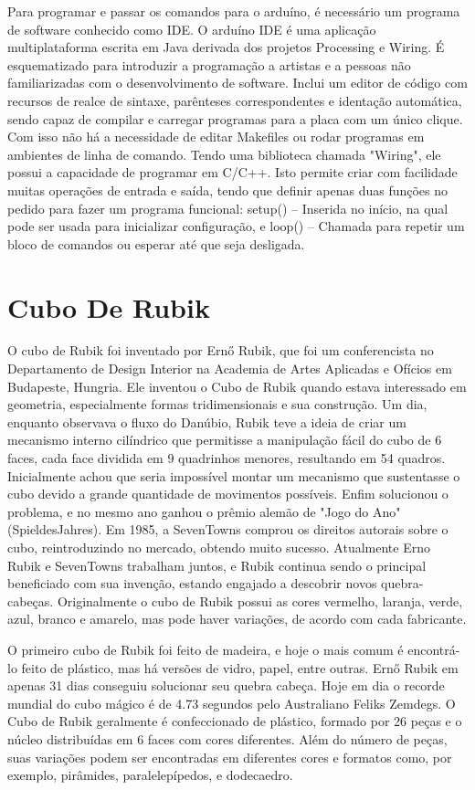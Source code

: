     Para programar e passar os comandos para o arduíno, é necessário um programa de software conhecido como IDE.  O arduíno IDE é uma aplicação multiplataforma escrita em Java derivada dos projetos Processing e Wiring. É esquematizado para introduzir a programação a artistas e a pessoas não familiarizadas com o desenvolvimento de software. Inclui um editor de código com recursos de realce de sintaxe, parênteses correspondentes e identação automática, sendo capaz de compilar e carregar programas para a placa com um único clique. Com isso não há a necessidade de editar Makefiles ou rodar programas em ambientes de linha de comando. Tendo uma biblioteca chamada "Wiring", ele possui a capacidade de programar em C/C++. Isto permite criar com facilidade muitas operações de entrada e saída, tendo que definir apenas duas funções no pedido para fazer um programa funcional: setup() – Inserida no início, na qual pode ser usada para inicializar configuração, e loop() – Chamada para repetir um bloco de comandos ou esperar até que seja desligada.\cite{arduinowiki}


\section{Cubo De Rubik}

O cubo de Rubik foi inventado por Ernő Rubik, que foi um conferencista no Departamento de Design Interior na Academia de Artes Aplicadas e Ofícios em Budapeste, Hungria. Ele inventou o  Cubo de Rubik quando estava interessado em geometria, especialmente formas tridimensionais e sua construção. Um dia, enquanto observava o fluxo do Danúbio, Rubik teve a ideia de criar um mecanismo interno cilíndrico que permitisse a manipulação fácil do cubo de 6 faces, cada face dividida em 9 quadrinhos menores, resultando em 54 quadros. Inicialmente achou que seria impossível montar um mecanismo que sustentasse o cubo devido a grande quantidade de movimentos possíveis. Enfim solucionou o problema, e no mesmo ano ganhou o prêmio alemão de "Jogo do Ano" (SpieldesJahres). Em 1985, a SevenTowns comprou os direitos autorais sobre o cubo, reintroduzindo no mercado, obtendo muito sucesso. Atualmente Erno Rubik e SevenTowns trabalham juntos, e Rubik continua sendo o principal beneficiado com sua invenção, estando engajado a descobrir novos quebra-cabeças. Originalmente o cubo de Rubik possui as cores vermelho, laranja, verde, azul, branco e amarelo, mas pode haver variações, de acordo com cada fabricante.\cite{cubohist}

    
    O primeiro cubo de Rubik foi feito de madeira, e hoje o mais comum é encontrá-lo feito de plástico, mas há versões de vidro, papel, entre outras. Ernő Rubik em apenas 31 dias conseguiu solucionar seu quebra cabeça. Hoje em dia o recorde mundial do cubo mágico é de 4.73 segundos pelo Australiano Feliks Zemdegs. O Cubo de Rubik geralmente é confeccionado de plástico, formado por 26 peças e o núcleo distribuídas em 6 faces com cores diferentes. Além do número de peças, suas variações podem ser encontradas em diferentes cores e formatos como, por exemplo, pirâmides, paralelepípedos, e dodecaedro.\cite{cubowiki}
    
